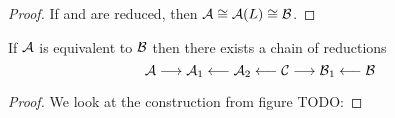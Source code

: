 \begin{proof}
If  and  are reduced, then $\mbox{$\mathcal{A}$} \cong \mbox{$\mathcal{A}$}(L) \cong \mbox{$\mathcal{B}$}$.
\end{proof}

\begin{corollary}
If $\mbox{$\mathcal{A}$}$ is equivalent to $\mbox{$\mathcal{B}$}$ then there exists a chain of reductions
\[ \mbox{$\mathcal{A}$} \longrightarrow \mbox{$\mathcal{A}$}_1 \longleftarrow \mbox{$\mathcal{A}$}_2 \longleftarrow \mbox{$\mathcal{C}$}
\longrightarrow \mbox{$\mathcal{B}$}_1 \longleftarrow \mbox{$\mathcal{B}$} \]
\end{corollary}

\begin{proof}
We look at the construction from figure TODO:
\end{proof}























